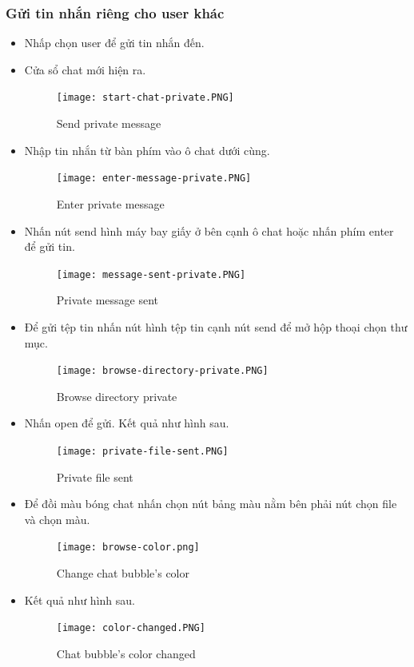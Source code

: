 \documentclass[a4paper]{article}
\begin{document}
	\subsubsection{Gửi tin nhắn riêng cho user khác}
	\begin{itemize}
		\item Nhấp chọn user để gửi tin nhắn đến.
		\item Cửa sổ chat mới hiện ra.     
		\begin{figure}[H]
			\centering
			\texttt{[image: start-chat-private.PNG]}
			\caption{Send private message}
			\label{fig:my_label}
		\end{figure}
		\item Nhập tin nhắn từ bàn phím vào ô chat dưới cùng.
		\begin{figure}[H]
			\centering
			\texttt{[image: enter-message-private.PNG]}
			\caption{Enter private message}
			\label{fig:my_label}
		\end{figure}
		\item Nhấn nút send hình máy bay giấy ở bên cạnh ô chat hoặc nhấn phím enter để gửi tin.
		\begin{figure}[H]
			\centering
			\texttt{[image: message-sent-private.PNG]}
			\caption{Private message sent}
			\label{fig:my_label}
		\end{figure}
		\item Để gửi tệp tin nhấn nút hình tệp tin cạnh nút send để mở hộp thoại chọn thư mục.
		\begin{figure}[H]
			\centering
			\texttt{[image: browse-directory-private.PNG]}
			\caption{Browse directory private}
			\label{fig:my_label}
		\end{figure}
		\item Nhấn open để gửi. Kết quả như hình sau.
		\begin{figure}[H]
			\centering
			\texttt{[image: private-file-sent.PNG]}
			\caption{Private file sent}
			\label{fig:my_label}
		\end{figure}
		\item Để đồi màu bóng chat nhấn chọn nút bảng màu nằm bên phải nút chọn file và chọn màu.
		\begin{figure}[H]
			\centering
			\texttt{[image: browse-color.png]}
			\caption{Change chat bubble's color}
			\label{fig:my_label}
		\end{figure}
		\item Kết quả như hình sau.
		\begin{figure}[H]
			\centering
			\texttt{[image: color-changed.PNG]}
			\caption{Chat bubble's color changed}
			\label{fig:my_label}
		\end{figure}
	\end{itemize}
\end{document}
